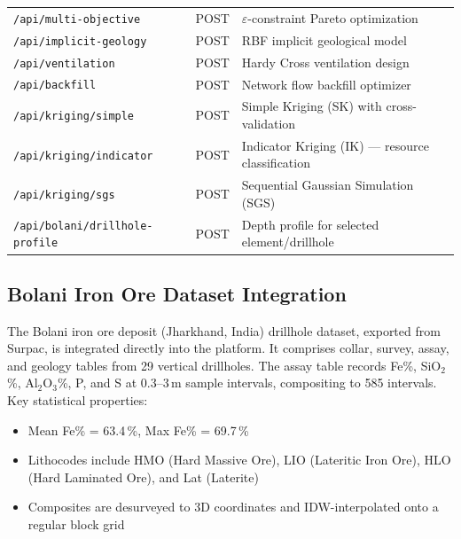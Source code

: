 \documentclass[12pt,a4paper]{article}
\begin{document}
\begin{table}[H]
\begin{tabular}{@{}lll@{}}
\texttt{/api/multi-objective} & POST & $\varepsilon$-constraint Pareto optimization \\
\texttt{/api/implicit-geology} & POST & RBF implicit geological model \\
\texttt{/api/ventilation} & POST & Hardy Cross ventilation design \\
\texttt{/api/backfill} & POST & Network flow backfill optimizer \\
\texttt{/api/kriging/simple} & POST & Simple Kriging (SK) with cross-validation \\
\texttt{/api/kriging/indicator} & POST & Indicator Kriging (IK) — resource classification \\
\texttt{/api/kriging/sgs} & POST & Sequential Gaussian Simulation (SGS) \\
\texttt{/api/bolani/drillhole-profile} & POST & Depth profile for selected element/drillhole \\
\bottomrule
\end{tabular}
\end{table}

\subsection{Bolani Iron Ore Dataset Integration}
\label{sec:bolani}

The Bolani iron ore deposit (Jharkhand, India) drillhole dataset, exported from Surpac, is integrated directly into the platform. It comprises collar, survey, assay, and geology tables from 29 vertical drillholes. The assay table records Fe\%, SiO$_2$\%, Al$_2$O$_3$\%, P, and S at 0.3--3\,m sample intervals, compositing to 585 intervals. Key statistical properties:

\begin{itemize}
  \item Mean Fe\% = 63.4\,\%, Max Fe\% = 69.7\,\%
  \item Lithocodes include HMO (Hard Massive Ore), LIO (Lateritic Iron Ore), HLO (Hard Laminated Ore), and Lat (Laterite)
  \item Composites are desurveyed to 3D coordinates and IDW-interpolated onto a regular block grid
\end{itemize}
\end{document}
